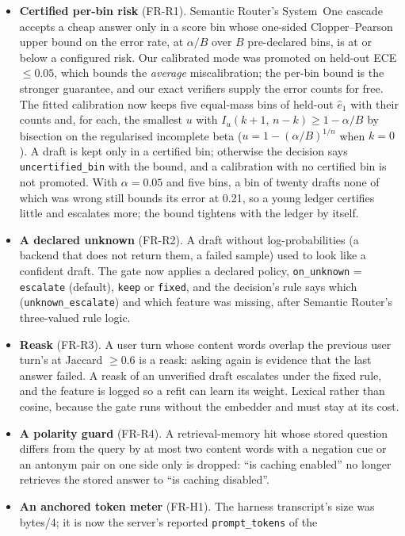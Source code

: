 \begin{itemize}
\item \textbf{Certified per-bin risk} (FR-R1). Semantic Router's System~One cascade accepts a cheap answer only in a score bin whose one-sided
  Clopper--Pearson upper bound on the error rate, at $\alpha/B$ over $B$ pre-declared bins, is at or below a configured risk. Our calibrated mode was
  promoted on held-out ECE $\le 0.05$, which bounds the \emph{average} miscalibration; the per-bin bound is the stronger guarantee, and our exact verifiers
  supply the error counts for free. The fitted calibration now keeps five equal-mass bins of held-out $\hat e_1$ with their counts and, for each, the
  smallest $u$ with $I_u(k{+}1,\,n{-}k)\ge 1-\alpha/B$ by bisection on the regularised incomplete beta ($u=1-(\alpha/B)^{1/n}$ when $k=0$). A draft is kept
  only in a certified bin; otherwise the decision says \texttt{uncertified\_bin} with the bound, and a calibration with no certified bin is not promoted.
  With $\alpha=0.05$ and five bins, a bin of twenty drafts none of which was wrong still bounds its error at 0.21, so a young ledger certifies little and
  escalates more; the bound tightens with the ledger by itself.
\item \textbf{A declared unknown} (FR-R2). A draft without log-probabilities (a backend that does not return them, a failed sample) used to look like a
  confident draft. The gate now applies a declared policy, \texttt{on\_unknown} = \texttt{escalate} (default), \texttt{keep} or \texttt{fixed}, and the
  decision's rule says which (\texttt{unknown\_escalate}) and which feature was missing, after Semantic Router's three-valued rule logic.
\item \textbf{Reask} (FR-R3). A user turn whose content words overlap the previous user turn's at Jaccard $\ge 0.6$ is a reask: asking again is evidence
  that the last answer failed. A reask of an unverified draft escalates under the fixed rule, and the feature is logged so a refit can learn its weight.
  Lexical rather than cosine, because the gate runs without the embedder and must stay at its cost.
\item \textbf{A polarity guard} (FR-R4). A retrieval-memory hit whose stored question differs from the query by at most two content words with a negation
  cue or an antonym pair on one side only is dropped: ``is caching enabled'' no longer retrieves the stored answer to ``is caching disabled''.
\item \textbf{An anchored token meter} (FR-H1). The harness transcript's size was bytes/4; it is now the server's reported \texttt{prompt\_tokens} of the

\end{itemize}
